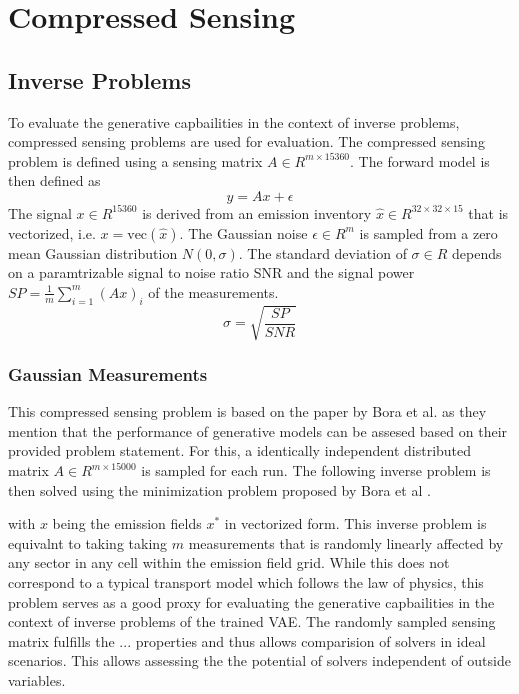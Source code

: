 
\chapter{Compressed Sensing}\label{chapter:compressed_sensing}

\section{Inverse Problems}
To evaluate the generative capbailities in the context of inverse problems, compressed sensing problems are used for evaluation.
The compressed sensing problem is defined using a sensing matrix $A \in R^{m \times 15360}$.
The forward model is then defined as
\begin{equation}
    y = A x + \epsilon
\end{equation}
The signal $x \in R^{15360}$ is derived from an emission inventory $\hat{x} \in R^{32 \times 32 \times 15}$ that is vectorized, i.e. $x = \text{vec}(\hat{x})$.
The Gaussian noise $\epsilon \in R^m$ is sampled from a zero mean Gaussian distribution $N(0, \sigma)$.
The standard deviation of $\sigma \in R$ depends on a paramtrizable signal to noise ratio SNR and the signal power $SP = \frac{1}{m}\sum_{i=1}^m{\left(Ax\right)_i}$ of the measurements.
\begin{equation}
    \sigma = \sqrt{\frac{SP}{SNR}}
\end{equation}

\subsection{Gaussian Measurements}
This compressed sensing problem is based on the paper by Bora et al. as they mention that the performance of generative models can be assesed based on their provided problem statement.
For this, a identically independent distributed matrix $A \in R^{m \times 15000}$ is sampled for each run.
The following inverse problem is then solved using the minimization problem proposed by Bora et al \parencite{CSUsingAI}.

with $x$ being the emission fields $x^*$ in vectorized form.
This inverse problem is equivalnt to taking taking $m$ measurements that is randomly linearly affected by any sector in any cell within the emission field grid.
While this does not correspond to a typical transport model which follows the law of physics, this problem serves as a good proxy for evaluating the generative capbailities in the context of inverse problems of the trained VAE. 
The randomly sampled sensing matrix fulfills the ... properties and thus allows comparision of solvers in ideal scenarios.
This allows assessing the the potential of solvers independent of outside variables.

